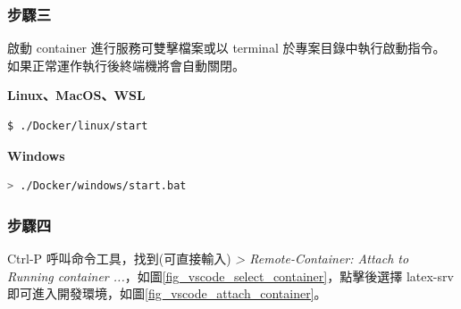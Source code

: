 \subsubsection*{步驟三}

啟動 container 進行服務可雙擊檔案或以 terminal 於專案目錄中執行啟動指令。如果正常運作執行後終端機將會自動關閉。

\begin{flushleft}
        \textbf{Linux、MacOS、WSL}
\end{flushleft}

\begin{lstlisting}[language=bash]
        $ ./Docker/linux/start
\end{lstlisting}

\begin{flushleft}
        \textbf{Windows}
\end{flushleft}

\begin{lstlisting}[language=bash]
        > ./Docker/windows/start.bat
\end{lstlisting}

\subsubsection*{步驟四}

Ctrl-P 呼叫命令工具，找到(可直接輸入) \emph{> Remote-Container: Attach to Running container ...}，如圖\ref{fig_vscode_select_container}，點擊後選擇 latex-srv 即可進入開發環境，如圖\ref{fig_vscode_attach_container}。


